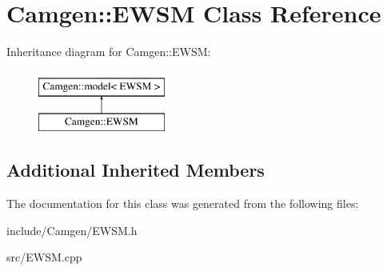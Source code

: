 \hypertarget{a00215}{}\section{Camgen\+:\+:E\+W\+S\+M Class Reference}
\label{a00215}
Inheritance diagram for Camgen\+:\+:E\+W\+S\+M\+:\begin{figure}[H]
\begin{center}
\leavevmode
\includegraphics[height=2.000000cm]{a00215}
\end{center}
\end{figure}
\subsection*{Additional Inherited Members}


The documentation for this class was generated from the following files\+:\begin{DoxyCompactItemize}
\item 
include/\+Camgen/E\+W\+S\+M.\+h\item 
src/E\+W\+S\+M.\+cpp\end{DoxyCompactItemize}
